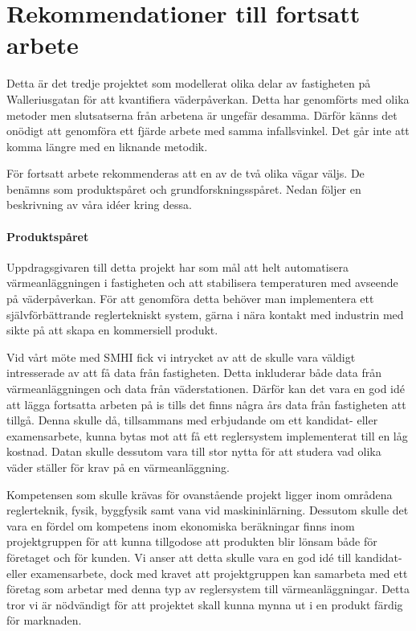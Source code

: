 \section{Rekommendationer till fortsatt arbete}

Detta är det tredje projektet som modellerat olika delar av fastigheten på Walleriusgatan för att
kvantifiera väderpåverkan. Detta har genomförts med olika metoder men slutsatserna från arbetena är ungefär desamma.
Därför känns det onödigt att genomföra ett fjärde arbete med samma infallsvinkel. 
Det går inte att komma längre med en liknande metodik.

För fortsatt arbete rekommenderas att en av de två olika vägar väljs. De benämns
som produktspåret och grundforskningsspåret. Nedan följer en beskrivning av våra idéer kring dessa.

\paragraph{Produktspåret}
Uppdragsgivaren till detta projekt har som mål att helt automatisera värmeanläggningen i fastigheten och att stabilisera
temperaturen med avseende på väderpåverkan. För att genomföra detta behöver man implementera ett självförbättrande
reglertekniskt system, gärna i nära kontakt med industrin med sikte på att skapa en kommersiell produkt. 

Vid vårt möte med SMHI fick vi intrycket av att de skulle vara väldigt intresserade av att få data från fastigheten.
Detta inkluderar både data från värmeanläggningen och data från väderstationen. Därför kan det vara
en god idé att lägga fortsatta arbeten på is tills det finns några års data från fastigheten att tillgå.
Denna skulle då, tillsammans med erbjudande om ett kandidat- eller examensarbete, kunna bytas mot att få ett reglersystem implementerat till en låg kostnad. Datan skulle dessutom vara till stor nytta för att studera vad olika väder ställer för
krav på en värmeanläggning. 

Kompetensen som skulle krävas för ovanstående projekt ligger inom områdena reglerteknik, fysik, byggfysik samt vana vid maskininlärning.
Dessutom skulle det vara en fördel om kompetens inom ekonomiska beräkningar finns inom projektgruppen för att
kunna tillgodose att produkten blir lönsam både för företaget och för kunden. Vi anser att detta skulle vara en god
idé till kandidat- eller examensarbete, dock med kravet att projektgruppen kan samarbeta med
ett företag som arbetar med denna typ av reglersystem till värmeanläggningar. Detta tror vi är nödvändigt för att projektet skall kunna mynna ut i en produkt färdig för marknaden.


